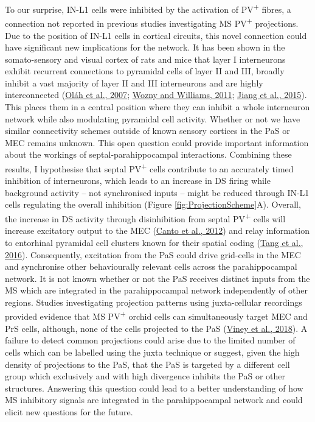 \documentclass[
  12pt,
  a4paper,
  openany]{book}
\begin{document}
To our surprise, IN-L1 cells were inhibited by the activation of PV\textsuperscript{+} fibres, a connection not reported in previous studies investigating MS PV\textsuperscript{+} projections. Due to the position of IN-L1 cells in cortical circuits, this novel connection could have significant new implications for the network. It has been shown in the somato-sensory and visual cortex of rats and mice that layer I interneurons exhibit recurrent connections to pyramidal cells of layer II and III, broadly inhibit a vast majority of layer II and III interneurons and are highly interconnected (\protect\hyperlink{ref-olah_output_2007}{Oláh et al., 2007}; \protect\hyperlink{ref-wozny_specificity_2011}{Wozny and Williams, 2011}; \protect\hyperlink{ref-jiang_principles_2015}{Jiang et al., 2015}). This places them in a central position where they can inhibit a whole interneuron network while also modulating pyramidal cell activity. Whether or not we have similar connectivity schemes outside of known sensory cortices in the PaS or MEC remains unknown. This open question could provide important information about the workings of septal-parahippocampal interactions. Combining these results, I hypothesise that septal PV\textsuperscript{+} cells contribute to an accurately timed inhibition of interneurons, which leads to an increase in DS firing while background activity -- not synchronised inputs -- might be reduced through IN-L1 cells regulating the overall inhibition (Figure \ref{fig:ProjectionScheme}A). Overall, the increase in DS activity through disinhibition from septal PV\textsuperscript{+} cells will increase excitatory output to the MEC (\protect\hyperlink{ref-canto_all_2012}{Canto et al., 2012}) and relay information to entorhinal pyramidal cell clusters known for their spatial coding (\protect\hyperlink{ref-tang_functional_2016}{Tang et al., 2016}). Consequently, excitation from the PaS could drive grid-cells in the MEC and synchronise other behaviourally relevant cells across the parahippocampal network. It is not known whether or not the PaS receives distinct inputs from the MS which are integrated in the parahippocampal network independently of other regions. Studies investigating projection patterns using juxta-cellular recordings provided evidence that MS PV\textsuperscript{+} orchid cells can simultaneously target MEC and PrS cells, although, none of the cells projected to the PaS (\protect\hyperlink{ref-viney_shared_2018}{Viney et al., 2018}). A failure to detect common projections could arise due to the limited number of cells which can be labelled using the juxta technique or suggest, given the high density of projections to the PaS, that the PaS is targeted by a different cell group which exclusively and with high divergence inhibits the PaS or other structures. Answering this question could lead to a better understanding of how MS inhibitory signals are integrated in the parahippocampal network and could elicit new questions for the future.
\end{document}
